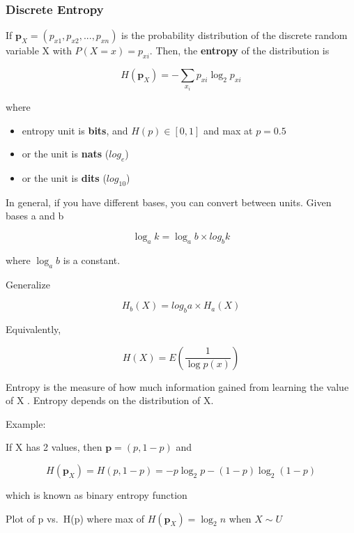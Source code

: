 \documentclass[
]{book}
\providecommand{\tightlist}{%
  \setlength{\itemsep}{0pt}\setlength{\parskip}{0pt}}
\begin{document}
\hypertarget{discrete-entropy}{%
\subsubsection{Discrete Entropy}\label{discrete-entropy}}

If \(\mathbf{p}_X = (p_{x1},p_{x2},...,p_{xn})\) is the probability distribution of the discrete random variable X with
\(P(X = x) = p_{xi}\). Then, the \textbf{entropy} of the distribution is \citep{Shannon_1948}

\[
H(\mathbf{p}_X) = -\sum_{x_i} p_{xi}\log_2 p_{xi}
\]

where

\begin{itemize}
\tightlist
\item
  entropy unit is \textbf{bits}, and \(H(p) \in [0,1]\) and max at \(p = 0.5\)
\item
  or the unit is \textbf{nats} (\(log_e\))
\item
  or the unit is \textbf{dits} (\(log_{10}\))
\end{itemize}

In general, if you have different bases, you can convert between units. Given bases a and b

\[
\log_a k = \log_a b \times log_b k 
\]

where \(\log_a b\) is a constant.

Generalize

\[
H_b(X) = log_b a \times H_a(X)
\]

Equivalently,

\[
H(X) = E(\frac{1}{\log p(x)})
\]

Entropy is the measure of how much information gained from learning the value of X \citep[pp.262]{Zwillinger_1995}. Entropy
depends on the distribution of X.

\hfill\break
Example:

If X has 2 values, then \(\mathbf{p}= (p,1-p)\) and

\[
H(\mathbf{p}_X ) = H(p,1-p) = -p \log_2 p - (1-p) \log_2 (1-p)
\]

which is known as binary entropy function

Plot of p vs.~H(p) where max of \(H(\mathbf{p}_X) = \log_2 n\) when \(X \sim U\)
\end{document}
